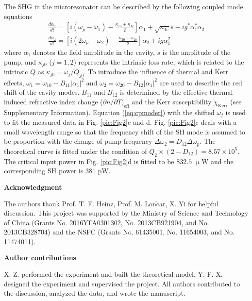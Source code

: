 \documentclass[a4paper,8pt,hyperref, twocolumn, aps, prl]{article}
\begin{document}
\noindent The SHG in the microresonator can be described by the following coupled mode equations
\begin{gather}
\frac{d{\alpha}_1}{dt} = [i(\omega_p-\omega_1)-\frac{\kappa_{10}+\kappa_{1e}}{2}]{\alpha}_1+\sqrt{\kappa_{1e}}s-ig^*{\alpha}_1^*{\alpha}_2 \\
\frac{d{\alpha}_2}{dt} = [i(2\omega_p-\omega_2)-\frac{\kappa_{20}+\kappa_{2e}}{2}]{\alpha}_2+ig{\alpha}_1^2
\label{eq:cpmoder}
\end{gather}
where ${\alpha}_1$ denotes the field amplitude in the cavity, $s$ is the amplitude of the pump, and $\kappa_{j0}$ ($j = 1,2$) represents the intrinsic loss rate, which is related to the intrinsic $Q$ as $\kappa_{j0} = \omega_{j}/Q_{j0}$. 
To introduce the influence of thermal and Kerr effects, $\omega_1 =\omega_{10} -B_{11}|\alpha_1|^2$ and $\omega_2 =\omega_{20} -B_{12}|\alpha_1|^2$ are used to describe the red shift of the cavity modes.
$B_{11}$ and $B_{12}$ is determined by the effective thermal-induced refractive index change (${\partial n}/{\partial T})_{\mathrm{eff}}$ and the Kerr susceptibility $\chi_{\mathrm{Kerr}}$ (see Supplementary Information).
Equation (\ref{eq:cpmoder}) with the shifted $\omega_j$ is used to fit the measured data in Fig. \ref{pic:Fig2}c and d.
Fig. \ref{pic:Fig2}c deals with a small wavelength range so that the frequency shift of the SH mode is assumed to be proportion with the change of pump frequency $\Delta \omega_2 = D_{12}\Delta \omega_p$.
The theoretical curve is fitted under the condition of $Q_2\times(2-D_{12})=8.57\times 10^5$.
The critical input power in Fig. \ref{pic:Fig2}d is fitted to be $832.5$ $\upmu$W and the corresponding SH power is $381$ pW.



\bigskip
\noindent \textbf{\large Acknowledgment}

\noindent The authors thank Prof. T. F. Heinz, Prof. M. Lon$\mathrm{\check{c}}$ar, X. Yi for helpful discussion. 
This project was supported by the Ministry of Science
and Technology of China (Grants No. 2016YFA0301302,
No. 2013CB921904, and No. 2013CB328704) and the NSFC
(Grants No. 61435001, No. 11654003, and No. 11474011).

\bigskip
\noindent \textbf{\large Author contributions}

\noindent X. Z. performed the experiment and built the theoretical model. Y.-F. X. designed the
experiment and supervised the project. All authors contributed
to the discussion, analyzed the data, and wrote the
manuscript.
\end{document}
